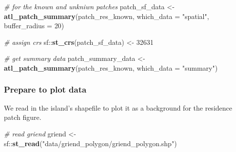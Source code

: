 \documentclass[
]{scrartcl}
\newenvironment{Shaded}{}{}
\newcommand{\CommentTok}[1]{\textcolor[rgb]{0.38,0.63,0.69}{\textit{#1}}}
\newcommand{\DataTypeTok}[1]{\textcolor[rgb]{0.56,0.13,0.00}{#1}}
\newcommand{\DecValTok}[1]{\textcolor[rgb]{0.25,0.63,0.44}{#1}}
\newcommand{\KeywordTok}[1]{\textcolor[rgb]{0.00,0.44,0.13}{\textbf{#1}}}
\newcommand{\NormalTok}[1]{#1}
\newcommand{\OperatorTok}[1]{\textcolor[rgb]{0.40,0.40,0.40}{#1}}
\newcommand{\StringTok}[1]{\textcolor[rgb]{0.25,0.44,0.63}{#1}}
\begin{document}
\begin{Shaded}
\begin{Highlighting}[]
\CommentTok{\# for the known and unkniwn patches}
\NormalTok{patch\_sf\_data <{-}}\StringTok{ }\KeywordTok{atl\_patch\_summary}\NormalTok{(patch\_res\_known, }
                                   \DataTypeTok{which\_data =} \StringTok{"spatial"}\NormalTok{,}
                                   \DataTypeTok{buffer\_radius =} \DecValTok{20}\NormalTok{)}

\CommentTok{\# assign crs}
\NormalTok{sf}\OperatorTok{::}\KeywordTok{st\_crs}\NormalTok{(patch\_sf\_data) <{-}}\StringTok{ }\DecValTok{32631}

\CommentTok{\# get summary data}
\NormalTok{patch\_summary\_data <{-}}\StringTok{ }\KeywordTok{atl\_patch\_summary}\NormalTok{(patch\_res\_known, }
                                        \DataTypeTok{which\_data =} \StringTok{"summary"}\NormalTok{)}
\end{Highlighting}
\end{Shaded}

\hypertarget{prepare-to-plot-data}{%
\subsubsection{Prepare to plot data}\label{prepare-to-plot-data}}

We read in the island's shapefile to plot it as a background for the residence patch figure.

\begin{Shaded}
\begin{Highlighting}[]
\CommentTok{\# read griend}
\NormalTok{griend <{-}}\StringTok{ }\NormalTok{sf}\OperatorTok{::}\KeywordTok{st\_read}\NormalTok{(}\StringTok{"data/griend\_polygon/griend\_polygon.shp"}\NormalTok{)}
\end{Highlighting}
\end{Shaded}
\end{document}

